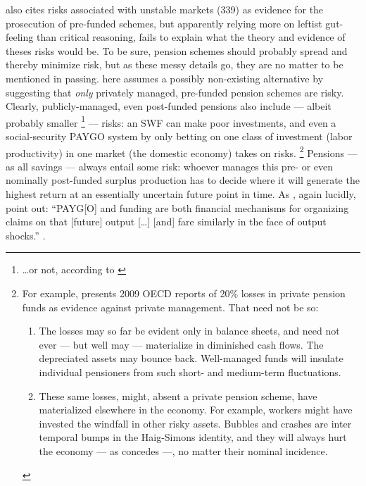 \begin{enumerate}
	\citeauthor{Cerami2009a} also cites risks associated with unstable markets (339) as evidence for the prosecution of pre-funded schemes, but apparently relying more on leftist gut-feeling than critical reasoning, fails to explain what the theory and evidence of theses risks would be.
To be sure, pension schemes should probably spread and thereby minimize risk, but as these messy details go, they are no matter to be mentioned in passing.
\citeauthor{Cerami2009a} here assumes a possibly non-existing alternative by suggesting that \emph{only} privately managed, pre-funded pension schemes are risky.
Clearly, publicly-managed, even post-funded pensions also include --- albeit probably smaller
	\footnote{
		\ldots or not, according to \citet[178]{Borsch-Supan2003}
	}
	--- risks:
	an \gls{SWF} can make poor investments, and even a social-security PAYGO system by only betting on one class of investment (labor productivity) in one market (the domestic economy) takes on risks.
	\footnote{
		For example, \citeauthor{Cerami2009a} presents 2009 \gls{OECD} reports of 20\% losses in private pension funds as evidence against private management.
		That need not be so:
		\begin{enumerate}
			\item The losses may so far be evident only in balance sheets, and need not ever --- but well may --- materialize in diminished cash flows.
			The depreciated assets may bounce back.
			Well-managed funds will insulate individual pensioners from such short- and medium-term fluctuations.
			\item These same losses, might, absent a private pension scheme, have materialized elsewhere in the economy.
			For example, workers might have invested the windfall in other risky assets.
			Bubbles and crashes are inter temporal bumps in the Haig-Simons identity, and they will always hurt the economy --- as \citet[340]{Cerami2009a} concedes ---, no matter their nominal incidence.
		\end{enumerate}
	}
	Pensions --- as all savings --- always entail some risk:
	whoever manages this pre- or even nominally post-funded surplus production has to decide where it will generate the highest return at an essentially uncertain future point in time.
As \citeauthor{Barr2005a}, again lucidly, point out:
``PAYG[O] and funding are both financial mechanisms for organizing claims on that [future] output [\ldots] [and] fare similarly in the face of output shocks.'' \citeyearpar[156]{Barr2005a}.


\end{enumerate}

